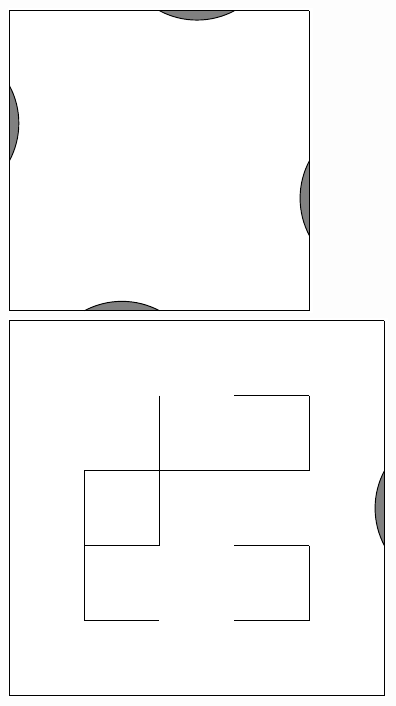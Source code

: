 \documentclass[12pt]{thesis}
\begin{document}
\begin{figure}
	\begin{center}
	\includegraphics[scale=0.75]{"images/TestSim.pdf"}
	\includegraphics[scale=0.75]{"images/Simulation.pdf"}

\end{center}
\end{figure}
\end{document}
